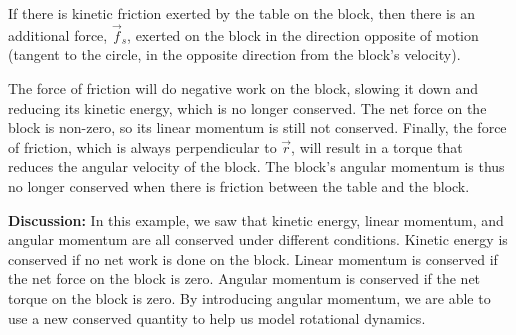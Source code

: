 \begin{example}
If there is kinetic friction exerted by the table on the block, then there is an additional force, $\vec f_s$, exerted on the block in the direction opposite of motion (tangent to the circle, in the opposite direction from the block's velocity). 

The force of friction will do negative work on the block, slowing it down and reducing its kinetic energy, which is no longer conserved. The net force on the block is non-zero, so its linear momentum is still not conserved. Finally, the force of friction, which is always perpendicular to $\vec r$, will result in a torque that reduces the angular velocity of the block. The block's angular momentum is thus no longer conserved when there is friction between the table and the block.

\textbf{Discussion: }In this example, we saw that kinetic energy, linear momentum, and angular momentum are all conserved under different conditions. Kinetic energy is conserved if no net work is done on the block. Linear momentum is conserved if the net force on the block is zero. Angular momentum is conserved if the net torque on the block is zero. By introducing angular momentum, we are able to use a new conserved quantity to help us model rotational dynamics.
\end{example} 

